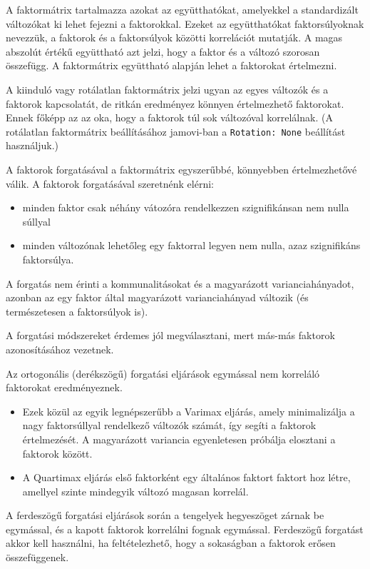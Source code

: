 \documentclass[
  letterpaper,
]{krantz}
\providecommand{\tightlist}{%
  \setlength{\itemsep}{0pt}\setlength{\parskip}{0pt}}\usepackage{longtable,booktabs,array}
\begin{document}
A faktormátrix tartalmazza azokat az együtthatókat, amelyekkel a
standardizált változókat ki lehet fejezni a faktorokkal. Ezeket az
együtthatókat faktorsúlyoknak nevezzük, a faktorok és a faktorsúlyok
közötti korrelációt mutatják. A magas abszolút értékű együttható azt
jelzi, hogy a faktor és a változó szorosan összefügg. A faktormátrix
együttható alapján lehet a faktorokat értelmezni.

A kiinduló vagy rotálatlan faktormátrix jelzi ugyan az egyes változók és
a faktorok kapcsolatát, de ritkán eredményez könnyen értelmezhető
faktorokat. Ennek főképp az az oka, hogy a faktorok túl sok változóval
korrelálnak. (A rotálatlan faktormátrix beállításához jamovi-ban a
\texttt{Rotation:\ None} beállítást használjuk.)

A faktorok forgatásával a faktormátrix egyszerűbbé, könnyebben
értelmezhetővé válik. A faktorok forgatásával szeretnénk elérni:

\begin{itemize}
\tightlist
\item
  minden faktor csak néhány vátozóra rendelkezzen szignifikánsan nem
  nulla súllyal
\item
  minden változónak lehetőleg egy faktorral legyen nem nulla, azaz
  szignifikáns faktorsúlya.
\end{itemize}

A forgatás nem érinti a kommunalitásokat és a magyarázott
varianciahányadot, azonban az egy faktor által magyarázott
varianciahányad változik (és természetesen a faktorsúlyok is).

A forgatási módszereket érdemes jól megválasztani, mert más-más faktorok
azonosításához vezetnek.

Az ortogonális (derékszögű) forgatási eljárások egymással nem korreláló
faktorokat eredményeznek.

\begin{itemize}
\item
  Ezek közül az egyik legnépszerűbb a Varimax eljárás, amely
  minimalizálja a nagy faktorsúllyal rendelkező változók számát, így
  segíti a faktorok értelmezését. A magyarázott variancia egyenletesen
  próbálja elosztani a faktorok között.
\item
  A Quartimax eljárás első faktorként egy általános faktort faktort hoz
  létre, amellyel szinte mindegyik változó magasan korrelál.
\end{itemize}

A ferdeszögű forgatási eljárások során a tengelyek hegyeszöget zárnak be
egymással, és a kapott faktorok korrelálni fognak egymással. Ferdeszögű
forgatást akkor kell használni, ha feltételezhető, hogy a sokaságban a
faktorok erősen összefüggenek.
\end{document}
